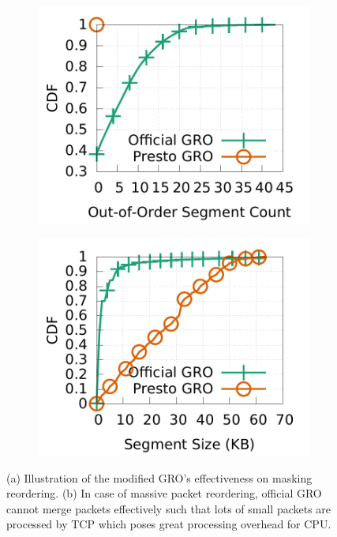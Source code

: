 \begin{figure}[!t]
	\centering
	\begin{subfigure}[b]{0.45\textwidth}
                \centering
  		\includegraphics[width=\textwidth]{presto/figures/gro_effectiveness/metric1_seg_cdf_compare.pdf}
		\caption{}
		\label{gro_effectiveness_on_reordering}
	\end{subfigure}
        \begin{subfigure}[b]{0.45\textwidth}
                \centering
		\includegraphics[width=\textwidth]{presto/figures/gro_effectiveness/metric1_pktsize_cdf_compare.pdf}
        	\caption{}
		\label{gro_effectiveness_on_pktsize}
	\end{subfigure}
	\caption{(a) Illustration of the modified GRO's effectiveness on masking reordering. 
		(b) In case of massive packet reordering, official GRO cannot merge packets effectively such that lots of small
                packets are processed by TCP which poses great processing overhead for CPU.}
	\label{gro_effectiveness}
\end{figure}

